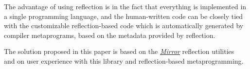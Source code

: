 The advantage of using reflection is in the fact that everything
is implemented in a single programming language, and the human-written
code can be closely tied with the customizable reflection-based
code which is automatically generated by compiler metaprograms,
based on the metadata provided by reflection.

The solution proposed in this paper is based on the
\href{http://kifri.fri.uniza.sk/~chochlik/mirror-lib/html/}{\em Mirror}
reflection utilities~\cite{mirror-doc-cpp11} and on
user experience with this library and reflection-based metaprogramming.
